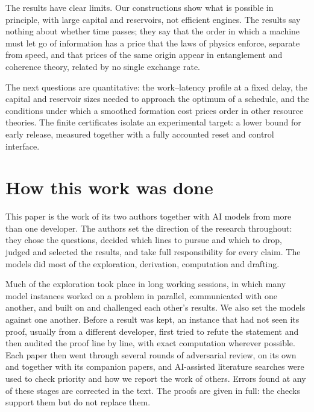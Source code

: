 \documentclass[11pt]{article}
\theoremstyle{definition}
\theoremstyle{remark}
\begin{document}
The results have clear limits. Our constructions show what is possible in principle, with large capital and reservoirs, not efficient engines. The results say nothing about whether time passes; they say that the order in which a machine must let go of information has a price that the laws of physics enforce, separate from speed, and that prices of the same origin appear in entanglement and coherence theory, related by no single exchange rate.

The next questions are quantitative: the work--latency profile at a fixed delay, the capital and reservoir sizes needed to approach the optimum of a schedule, and the conditions under which a smoothed formation cost prices order in other resource theories. The finite certificates isolate an experimental target: a lower bound for early release, measured together with a fully accounted reset and control interface.

\section*{How this work was done}
This paper is the work of its two authors together with AI models from more than one developer. The authors set the direction of the research throughout: they chose the questions, decided which lines to pursue and which to drop, judged and selected the results, and take full responsibility for every claim. The models did most of the exploration, derivation, computation and drafting.

Much of the exploration took place in long working sessions, in which many model instances worked on a problem in parallel, communicated with one another, and built on and challenged each other's results. We also set the models against one another. Before a result was kept, an instance that had not seen its proof, usually from a different developer, first tried to refute the statement and then audited the proof line by line, with exact computation wherever possible. Each paper then went through several rounds of adversarial review, on its own and together with its companion papers, and AI-assisted literature searches were used to check priority and how we report the work of others. Errors found at any of these stages are corrected in the text. The proofs are given in full: the checks support them but do not replace them.
\end{document}
